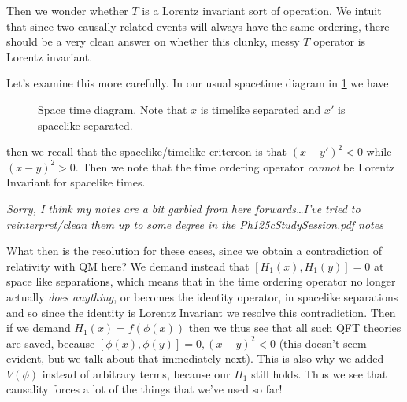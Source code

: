 \documentclass[10pt]{report}
\begin{document}
Then we wonder whether $T$ is a Lorentz invariant sort of operation. We intuit that since two causally related events will always have the same ordering, there should be a very clean answer on whether this clunky, messy $T$ operator is Lorentz invariant. 

Let's examine this more carefully. In our usual spacetime diagram in \ref{5.30.STdiag} we have
\begin{figure}[!h]
    \centering
    \caption{Space time diagram. Note that $x$ is timelike separated and $x'$ is spacelike separated.}
    \label{5.30.STdiag}
\end{figure}
then we recall that the spacelike/timelike critereon is that $(x - y')^2 < 0$ while $(x-y)^2 > 0$. Then we note that the time ordering operator \emph{cannot} be Lorentz Invariant for spacelike times.

{\em \small Sorry, I think my notes are a bit garbled from here forwards\dots I've tried to reinterpret/clean them up to some degree in the Ph125cStudySession.pdf notes}

What then is the resolution for these cases, since we obtain a contradiction of relativity with QM here? We demand instead that $\left[ H_1(x), H_1(y) \right] = 0$ at space like separations, which means that in the time ordering operator no longer actually \emph{does anything}, or becomes the identity operator, in spacelike separations and so since the identity is Lorentz Invariant we resolve this contradiction. Then if we demand $H_1(x) = f(\phi(x))$ then we thus see that all such QFT theories are saved, because $\left[ \phi(x), \phi(y) \right] = 0, (x-y)^2 < 0$ (this doesn't seem evident, but we talk about that immediately next). This is also why we added $V(\phi)$ instead of arbitrary terms, because our $H_1$ still holds. Thus we see that causality forces a lot of the things that we've used so far!
\end{document}
